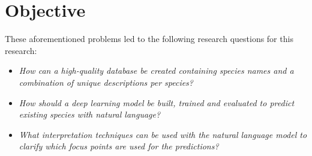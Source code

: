 \documentclass[a4paper, 12pt, oneside]{book} %
\begin{document}

\section{Objective}
These aforementioned problems led to the following research questions for this research:
\noindent 
\begin{itemize}
    
    \item \emph{How can a high-quality database be created containing species names and a combination of unique descriptions per species?}
    
    \item \emph{How should a deep learning model be built, trained and evaluated to predict existing species with natural language?}

    \item \emph{What interpretation techniques can be used with the natural language model to clarify which focus points are used for the predictions?}

\end{itemize}
\end{document}
